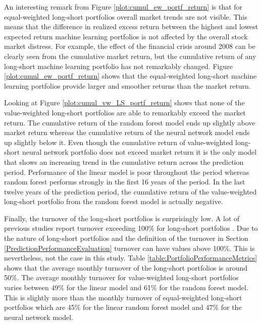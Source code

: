 \documentclass[12pt]{article}
\begin{document}
An interesting remark from Figure \ref{plot:cumul_ew_portf_return} is that for equal-weighted long-short portfolios overall market trends are not visible. This means that the difference in realized excess return between the highest and lowest expected return machine learning portfolios is not affected by the overall stock market distress. For example, the effect of the financial crisis around 2008 can be clearly seen from the cumulative market return, but the cumulative return of any long-short machine learning portfolio has not remarkably changed. Figure \ref{plot:cumul_ew_portf_return} shows that the equal-weighted long-short machine learning portfolios provide larger and smoother returns than the market return. \par

Looking at Figure \ref{plot:cumul_vw_LS_portf_return} shows that none of the value-weighted long-short portfolios are able to remarkably exceed the market return. The cumulative return of the random forest model ends up slightly above market return whereas the cumulative return of the neural network model ends up slightly below it. Even though the cumulative return of value-weighted long-short neural network portfolio does not exceed market return it is the only model that shows an increasing trend in the cumulative return across the prediction period. Performance of the linear model is poor throughout the period whereas random forest performs strongly in the first 16 years of the period. In the last twelve years of the prediction period, the cumulative return of the value-weighted long-short portfolio from the random forest model is actually negative. \par

Finally, the turnover of the long-short portfolios is surprisingly low. A lot of previous studies report turnover exceeding 100\% for long-short portfolios \citep[e.g.][]{guetal, TOBEK2021100588}. Due to the nature of long-short portfolios and the definition of the turnover in Section \ref{PredictionPerformanceEvaluation} turnover can have values above 100\%. This is nevertheless, not the case in this study. Table \ref{table:PortfolioPerformanceMetrics} shows that the average monthly turnover of the long-short portfolios is around 50\%. The average monthly turnover for value-weighted long-short portfolios varies between 49\% for the linear model and 61\% for the random forest model. This is slightly more than the monthly turnover of equal-weighted long-short portfolios which are 45\% for the linear random forest model and 47\% for the neural network model. \par
\end{document}
